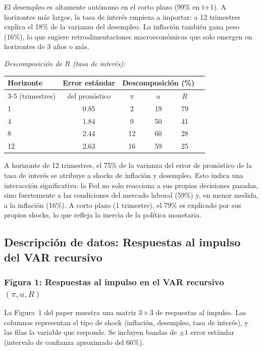 \documentclass[12pt]{article}
\begin{document}
\begin{hallazgo}
El desempleo es altamente aut\'onomo en el corto plazo (99\% en t+1). A horizontes m\'as largos, la tasa de inter\'es empieza a importar: a 12 trimestres explica el 18\% de la varianza del desempleo. La inflaci\'on tambi\'en gana peso (16\%), lo que sugiere retroalimentaciones macroecon\'omicas que solo emergen en horizontes de 3 a\~nos o m\'as.
\end{hallazgo}

\textit{Descomposici\'on de $R$ (tasa de inter\'es):}
\begin{center}
\begin{tabular}{lccccc}
\toprule
Horizonte & Error est\'andar & \multicolumn{3}{c}{Descomposici\'on (\%)} \\
\cmidrule(lr){3-5}
(trimestres) & del pron\'ostico & $\pi$ & $u$ & $R$ \\
\midrule
1  & 0.85 & 2  & 19 & 79 \\
4  & 1.84 & 9  & 50 & 41 \\
8  & 2.44 & 12 & 60 & 28 \\
12 & 2.63 & 16 & 59 & 25 \\
\bottomrule
\end{tabular}
\end{center}

\begin{hallazgo}
A horizonte de 12 trimestres, el 75\% de la varianza del error de pron\'ostico de la tasa de inter\'es se atribuye a shocks de inflaci\'on y desempleo. Esto indica una interacci\'on significativa: la Fed no solo reacciona a sus propias decisiones pasadas, sino fuertemente a las condiciones del mercado laboral (59\%) y, en menor medida, a la inflaci\'on (16\%). A corto plazo (1 trimestre), el 79\% es explicado por sus propios shocks, lo que refleja la inercia de la pol\'itica monetaria.
\end{hallazgo}

\subsection{Descripci\'on de datos: Respuestas al impulso del VAR recursivo}

\subsubsection{Figura 1: Respuestas al impulso en el VAR recursivo $(\pi, u, R)$}

La Figura~1 del paper muestra una matriz $3 \times 3$ de respuestas al impulso. Las columnas representan el tipo de shock (inflaci\'on, desempleo, tasa de inter\'es), y las filas la variable que responde. Se incluyen bandas de $\pm 1$ error est\'andar (intervalo de confianza aproximado del 66\%).
\end{document}
